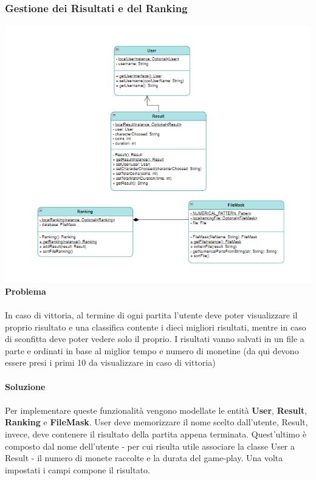 \documentclass[12pt, letterpaper]{article}
\begin{document}
        \subsubsection{Gestione dei Risultati e del Ranking}
            \includegraphics[width=\textwidth]{result_ranking.png}
            \textbf{Problema} 
            \\ \\
            In caso di vittoria, al termine di ogni partita l'utente deve poter visualizzare il proprio risultato e una classifica contente i dieci migliori risultati, mentre in caso di sconfitta deve poter vedere solo il proprio. %
            I risultati vanno salvati in un file a parte e ordinati in base al miglior tempo e numero di monetine (da qui devono essere presi i primi 10 da visualizzare in caso di vittoria)
            \\ \\
            \textbf{Soluzione} 
            \\ \\
            Per implementare queste funzionalità vengono modellate le entità \textbf{User}, \textbf{Result}, \textbf{Ranking} e \textbf{FileMask}. User deve memorizzare il nome scelto dall'utente, Result, invece, deve contenere il risultato della partita appena terminata. Quest'ultimo è composto dal nome dell'utente - per cui risulta utile associare la classe User a Result - il numero di monete raccolte e la durata del game-play. Una volta impostati i campi compone il risultato. 
\end{document}
